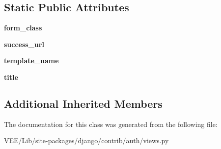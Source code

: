 \subsection*{Static Public Attributes}
\begin{DoxyCompactItemize}
\item 
\mbox{\label{classdjango_1_1contrib_1_1auth_1_1views_1_1_password_change_view_adf36de09bde0c499efe67833defb1301}} 
{\bfseries form\+\_\+class}
\item 
\mbox{\label{classdjango_1_1contrib_1_1auth_1_1views_1_1_password_change_view_ab0682d1d717d321b35159146190ec5cb}} 
{\bfseries success\+\_\+url}
\item 
\mbox{\label{classdjango_1_1contrib_1_1auth_1_1views_1_1_password_change_view_a655bdfcc63456cce52636d31c2c0e4a2}} 
{\bfseries template\+\_\+name}
\item 
\mbox{\label{classdjango_1_1contrib_1_1auth_1_1views_1_1_password_change_view_a738cb0355b58abf3064e7861e41abbb6}} 
{\bfseries title}
\end{DoxyCompactItemize}
\subsection*{Additional Inherited Members}


The documentation for this class was generated from the following file\+:\begin{DoxyCompactItemize}
\item 
V\+E\+E/\+Lib/site-\/packages/django/contrib/auth/views.\+py\end{DoxyCompactItemize}

